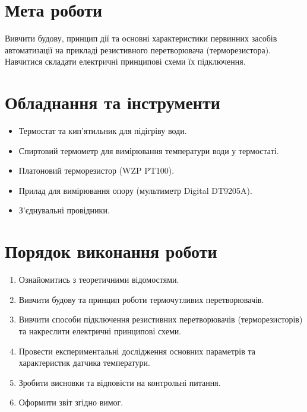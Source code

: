 \documentclass[a4paper]{article}
\begin{document}

\section*{Мета роботи}
Вивчити будову, принцип дії та основні характеристики первинних засобів автоматизації на прикладі резистивного перетворювача (терморезистора). Навчитися складати електричні принципові схеми їх підключення.

\section*{Обладнання та інструменти}
\begin{itemize}
    \item Термостат та кип'ятильник для підігріву води.
    \item Спиртовий термометр для вимірювання температури води у термостаті.
    \item Платоновий терморезистор (WZP PT100).
    \item Прилад для вимірювання опору (мультиметр Digital DT9205A).
    \item З’єднувальні провідники.
\end{itemize}

\section*{Порядок виконання роботи}
\begin{enumerate}
    \item Ознайомитись з теоретичними відомостями.
    \item Вивчити будову та принцип роботи термочутливих перетворювачів.
    \item Вивчити способи підключення резистивних перетворювачів (терморезисторів) та накреслити електричні принципові схеми.
    \item Провести експериментальні дослідження основних параметрів та характеристик датчика температури.
    \item Зробити висновки та відповісти на контрольні питання.
    \item Оформити звіт згідно вимог.
\end{enumerate}
\end{document}
